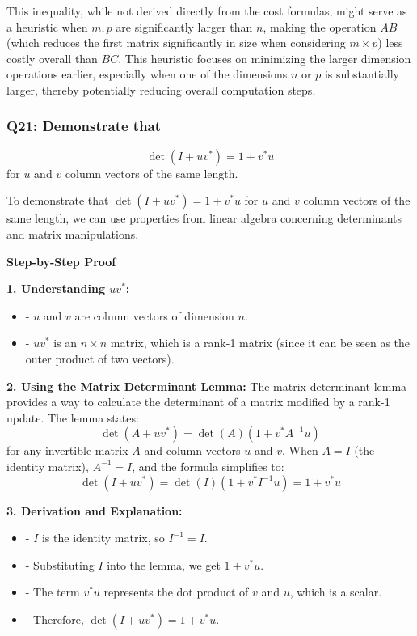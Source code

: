 \documentclass[8pt]{article}
\begin{document}
This inequality, while not derived directly from the cost formulas, might serve as a heuristic when \( m, p \) are significantly larger than \( n \), making the operation \( AB \) (which reduces the first matrix significantly in size when considering \( m \times p \)) less costly overall than \( BC \). This heuristic focuses on minimizing the larger dimension operations earlier, especially when one of the dimensions \(n\) or \(p\) is substantially larger, thereby potentially reducing overall computation steps.

\subsubsection*{Q21: Demonstrate that}
\[
\det(I + uv^*) = 1 + v^*u
\]
for \(u\) and \(v\) column vectors of the same length.

To demonstrate that \( \det(I + uv^*) = 1 + v^*u \) for \(u\) and \(v\) column vectors of the same length, we can use properties from linear algebra concerning determinants and matrix manipulations.

\textbf{Step-by-Step Proof}

\textbf{1. Understanding \(uv^*\):}
   \begin{itemize}
       \item - \( u \) and \( v \) are column vectors of dimension \( n \).
       \item - \( uv^* \) is an \( n \times n \) matrix, which is a rank-1 matrix (since it can be seen as the outer product of two vectors).
   \end{itemize}

\textbf{2. Using the Matrix Determinant Lemma:}
   The matrix determinant lemma provides a way to calculate the determinant of a matrix modified by a rank-1 update. The lemma states:
   \[
   \det(A + uv^*) = \det(A)(1 + v^*A^{-1}u)
   \]
   for any invertible matrix \( A \) and column vectors \( u \) and \( v \). When \( A = I \) (the identity matrix), \( A^{-1} = I \), and the formula simplifies to:
   \[
   \det(I + uv^*) = \det(I)(1 + v^*I^{-1}u) = 1 + v^*u
   \]

\textbf{3. Derivation and Explanation:}
   \begin{itemize}
       \item - \( I \) is the identity matrix, so \( I^{-1} = I \).
       \item - Substituting \( I \) into the lemma, we get \( 1 + v^*u \).
       \item - The term \( v^*u \) represents the dot product of \( v \) and \( u \), which is a scalar.
       \item - Therefore, \( \det(I + uv^*) = 1 + v^*u \).
   \end{itemize}
\end{document}

